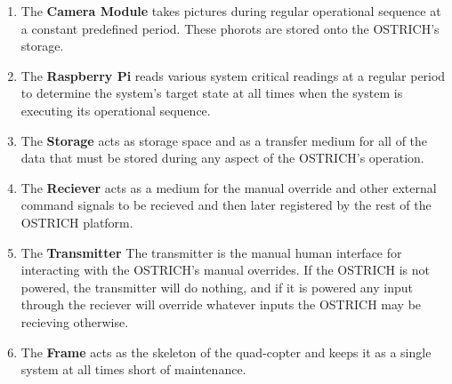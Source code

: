 \documentclass[10pt,letterpaper]{article}
\begin{document}
\begin{enumerate}[label=\textbf{NH\arabic*}]
        \item The \textbf{Camera Module} takes pictures during regular operational sequence at a constant predefined period. These phorots are stored onto the OSTRICH's storage.\\
        
        \item The \textbf{Raspberry Pi} reads various system critical readings at a regular period to determine the system's target state at all times when the system is executing its operational sequence.\\
        
        \item The \textbf{Storage} acts as storage space and as a transfer medium for all of the data that must be stored during any aspect of the OSTRICH's operation.\\
        
        \item The \textbf{Reciever} acts as a medium for the manual override and other external command signals to be recieved and then later registered by the rest of the OSTRICH platform.\\
        
        \item The \textbf{Transmitter} The transmitter is the manual human interface for interacting with the OSTRICH's manual overrides. If the OSTRICH is not powered, the transmitter will do nothing, and if it is powered any input through the reciever will override whatever inputs the OSTRICH may be recieving otherwise.\\
        
        \item The \textbf{Frame} acts as the skeleton of the quad-copter and keeps it as a single system at all times short of maintenance.\\    
	\end{enumerate}
    
\end{document}
